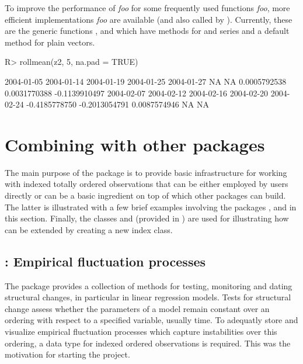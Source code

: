 \documentclass{Z}
\begin{document}
To improve the performance of \textit{foo}\code{)} for some frequently
used functions \textit{foo}, more efficient implementations \textit{foo}
are available (and also called by ). 
Currently, these are the generic functions , 
and  which have methods for  and  series and a 
default method for plain vectors.

\begin{Schunk}
\begin{Sinput}
R> rollmean(z2, 5, na.pad = TRUE)
\end{Sinput}
\begin{Soutput}
   2004-01-05    2004-01-14    2004-01-19    2004-01-25    2004-01-27 
           NA            NA  0.0005792538  0.0031770388 -0.1139910497 
   2004-02-07    2004-02-12    2004-02-16    2004-02-20    2004-02-24 
-0.4185778750 -0.2013054791  0.0087574946            NA            NA 
\end{Soutput}
\end{Schunk}


\section[Combining zoo with other packages]{Combining  with other packages}
\label{sec:combining}

The main purpose of the package  is to provide basic infrastructure for
working with indexed totally ordered observations that can be either employed by
users directly or can be a basic ingredient on top of which other packages can
build. The latter is illustrated with a few brief examples involving the packages
,  and  in this section. Finally, the 
classes  and  (provided in )
are used for illustrating how  can be extended by creating a new index class.

\subsection[strucchange: Empirical fluctuation processes]{: Empirical fluctuation processes}
\label{sec:strucchange}

The package  provides a collection of methods for testing,
monitoring and dating structural changes, in particular in linear regression models.
Tests for structural change assess whether the parameters of a model remain
constant over an ordering with respect to a specified variable, usually time.
To adequatly store and visualize empirical fluctuation processes which 
capture instabilities over this ordering, a data type for indexed ordered
observations is required. This was the motivation for starting the 
project.
\end{document}
